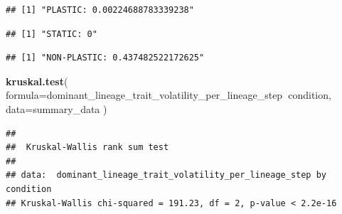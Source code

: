\documentclass[]{book}
\newenvironment{Shaded}{\begin{snugshade}}{\end{snugshade}}
\newcommand{\DataTypeTok}[1]{\textcolor[rgb]{0.13,0.29,0.53}{#1}}
\newcommand{\KeywordTok}[1]{\textcolor[rgb]{0.13,0.29,0.53}{\textbf{#1}}}
\newcommand{\NormalTok}[1]{#1}
\newcommand{\OperatorTok}[1]{\textcolor[rgb]{0.81,0.36,0.00}{\textbf{#1}}}
\newcommand{\StringTok}[1]{\textcolor[rgb]{0.31,0.60,0.02}{#1}}
\begin{document}
\begin{verbatim}
## [1] "PLASTIC: 0.00224688783339238"
\end{verbatim}

\begin{Shaded}
\end{Shaded}

\begin{verbatim}
## [1] "STATIC: 0"
\end{verbatim}

\begin{Shaded}
\end{Shaded}

\begin{verbatim}
## [1] "NON-PLASTIC: 0.437482522172625"
\end{verbatim}

\begin{Shaded}
\begin{Highlighting}[]
\KeywordTok{kruskal.test}\NormalTok{(}
  \DataTypeTok{formula=}\NormalTok{dominant_lineage_trait_volatility_per_lineage_step}\OperatorTok{~}\NormalTok{condition,}
  \DataTypeTok{data=}\NormalTok{summary_data}
\NormalTok{)}
\end{Highlighting}
\end{Shaded}

\begin{verbatim}
## 
##  Kruskal-Wallis rank sum test
## 
## data:  dominant_lineage_trait_volatility_per_lineage_step by condition
## Kruskal-Wallis chi-squared = 191.23, df = 2, p-value < 2.2e-16
\end{verbatim}

\begin{Shaded}
\end{Shaded}
\end{document}
